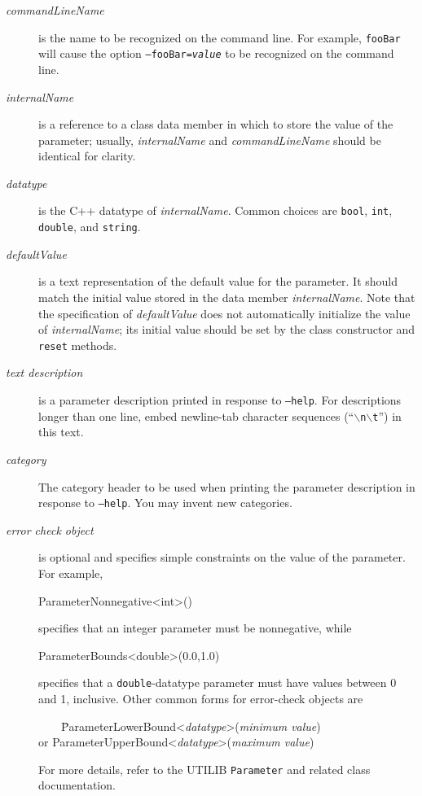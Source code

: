 \begin{description}
\item[\textmd{\emph{commandLineName}}] is the name to be recognized on
  the command line.  For example, \texttt{fooBar} will cause the
  option \texttt{--fooBar=\textrm{\emph{value}}} to be recognized on the
  command line.  
\item[\textmd{\emph{internalName}}] is a reference to a class data
  member in which to store the value of the parameter; usually,
  \emph{internalName} and \emph{commandLineName} should be identical
  for clarity.
\item[\textmd{\emph{datatype}}] is the C++ datatype of
  \emph{internalName}.  Common choices are \texttt{bool},
  \texttt{int}, \texttt{double}, and \texttt{string}.
\item[\textmd{\emph{defaultValue}}] is a text representation of 
  the default value for the
  parameter.  It should match the initial value stored in the data
  member \emph{internalName}.  Note that the specification of
  \emph{defaultValue} does not automatically initialize the value of
  \emph{internalName}; its initial value should be set by the class
  constructor and \texttt{reset} methods.
\item[\textmd{\emph{text description}}] is a parameter description
  printed in response to \texttt{--help}.  For descriptions longer
  than one line, embed newline-tab character sequences
  (``\texttt{$\backslash$n$\backslash$t}'') in this text.
\item[\textmd{\emph{category}}] The category header to be used when
  printing the parameter description in response to \texttt{--help}.
  You may invent new categories.
\item[\textmd{\emph{error check object}}] is optional and 
  specifies simple constraints
  on the value of the parameter.  For example,
  \begin{codeblock}
  ParameterNonnegative<int>()
  \end{codeblock}
  specifies that an integer parameter must be nonnegative, while
  \begin{codeblock}
  ParameterBounds<double>(0.0,1.0)
  \end{codeblock}
  specifies that a \texttt{double}-datatype parameter must have values
  between 0 and 1, inclusive.  Other common forms for error-check objects are
  \begin{codeblock}
  ~~~~\=ParameterLowerBound<\textit{datatype}>(\textit{minimum
      value}) \\
  \textrm{or}\>
  ParameterUpperBound<\textit{datatype}>(\textit{maximum
      value})
  \end{codeblock}
  \noindent For more details, refer to the UTILIB \texttt{Parameter}
  and related class documentation.
\end{description}

